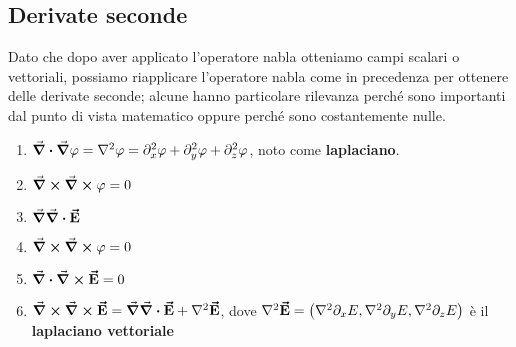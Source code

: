 \subsection{Derivate seconde}
Dato che dopo aver applicato l'operatore nabla otteniamo campi scalari o vettoriali, possiamo riapplicare l'operatore nabla come in precedenza per ottenere delle derivate seconde; alcune hanno particolare rilevanza perché sono importanti dal punto di vista matematico oppure perché sono costantemente nulle.
\begin{enumerate}[label=\roman*)]
	\item  $\div{\grad\phi}=\laplacian{\phi}=\partial^2_x\phi+\partial^2_y\phi+\partial^2_z\phi$, noto come \textbf{laplaciano}.
	\item $\curl{\curl{\varphi}}=0$
	\item $\grad{\div{\vb*{\va{E}}}}$
	\item $\curl{\curl{\varphi}}=0$
	\item $\div{\curl{\vb*{\va{E}}}}=0$
	\item $\curl{\curl{\vba{E}}}=\grad{\div{\vba{E}}}+\laplacian{\vba{E}}$, dove $\laplacian{\vba{E}}=\left(\laplacian{\partial_xE},\laplacian{\partial_yE},\laplacian{\partial_zE}\right)$ è il \textbf{laplaciano vettoriale}
\end{enumerate}

